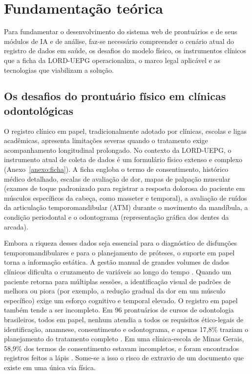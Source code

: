 \chapter{Fundamentação teórica}
\label{cap:fundamentacao}

Para fundamentar o desenvolvimento do sistema web de prontuários e de seus módulos de IA e de análise, faz-se necessário compreender o cenário atual do registro de dados em saúde, os desafios do modelo físico, os instrumentos clínicos que a ficha da LORD-UEPG operacionaliza, o marco legal aplicável e as tecnologias que viabilizam a solução.

\section{Os desafios do prontuário físico em clínicas odontológicas}
\label{sec:prontuario-fisico}

O registro clínico em papel, tradicionalmente adotado por clínicas, escolas e ligas acadêmicas, apresenta limitações severas quando o tratamento exige acompanhamento longitudinal prolongado. No contexto da LORD-UEPG, o instrumento atual de coleta de dados é um formulário físico extenso e complexo (Anexo~\ref{anexo:ficha}). A ficha engloba o termo de consentimento, histórico médico detalhado, escalas de avaliação de dor, mapas de palpação muscular (exames de toque padronizado para registrar a resposta dolorosa do paciente em músculos específicos da cabeça, como masseter e temporal), a avaliação de ruídos da articulação temporomandibular (ATM) durante o movimento da mandíbula, a condição periodontal e o odontograma (representação gráfica dos dentes da arcada).

Embora a riqueza desses dados seja essencial para o diagnóstico de disfunções temporomandibulares e para o planejamento de próteses, o suporte em papel torna a informação estática. A gestão manual de grandes volumes de dados clínicos dificulta o cruzamento de variáveis ao longo do tempo \cite{li2022}. Quando um paciente retorna para múltiplas sessões, a identificação visual de padrões de melhora ou piora (por exemplo, a redução gradual da dor em um músculo específico) exige um esforço cognitivo e temporal elevado. O registro em papel também tende a ser incompleto. Em 96 prontuários de cursos de odontologia brasileiros, todos em papel, nenhum atendia a todos os requisitos ético-legais de identificação, anamnese, consentimento e odontograma, e apenas 17,8\% traziam o planejamento do tratamento completo \cite{costa2020}. Em uma clínica-escola de Minas Gerais, 58,9\% dos termos de consentimento estavam incompletos, e foram encontrados registros feitos a lápis \cite{melo2025}. Some-se a isso o risco de extravio de um documento que existe em uma única via física.

